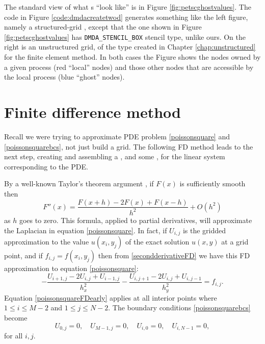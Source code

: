 The standard \PETSc view of what \pDM s ``look like'' is in Figure \ref{fig:petscghostvalues}.  The code in Figure \ref{code:dmdacreatetwod} generates something like the left figure, namely a structured-grid \pDM, except that the one shown in Figure \ref{fig:petscghostvalues} has \texttt{DMDA\_STENCIL\_BOX} stencil type, unlike ours.  On the right is an unstructured grid, of the type created in Chapter \ref{chap:unstructured} for the finite element method.  In both cases the Figure shows the nodes owned by a given process (red ``local'' nodes) and those other nodes that are accessible by the local process (blue ``ghost'' nodes).


\section{Finite difference method}

Recall we were trying to approximate PDE problem \eqref{poissonsquare} and \eqref{poissonsquarebcs}, not just build a grid.  The following FD method leads to the next step, creating and assembling a \pMat, and some \pVecs, for the linear system corresponding to the PDE.

By a well-known Taylor's theorem argument \citep{MortonMayers}, if $F(x)$ is sufficiently smooth then
\begin{equation}
   F''(x) = \frac{F(x+h) - 2 F(x) + F(x-h)}{h^2} + O(h^2)  \label{secondderivativeFD}
\end{equation}
as $h$ goes to zero.  This formula, applied to partial derivatives, will approximate the Laplacian in equation \eqref{poissonsquare}.  In fact, if $U_{i,j}$ is the gridded approximation to the value $u(x_i,y_j)$ of the exact solution $u(x,y)$ at a grid point, and if $f_{i,j} = f(x_i,y_j)$ then from \eqref{secondderivativeFD} we have this FD approximation to equation \eqref{poissonsquare}:
\begin{equation}
- \frac{U_{i+1,j} - 2 U_{i,j} + U_{i-1,j}}{h_x^2} - \frac{U_{i,j+1} - 2 U_{i,j} + U_{i,j-1}}{h_y^2} = f_{i,j}. \label{poissonsquareFDearly}
\end{equation}
Equation \eqref{poissonsquareFDearly} applies at all interior points where $1 \le i \le M-2$ and $1 \le j \le N-2$.  The boundary conditions \eqref{poissonsquarebcs} become
\begin{equation}
U_{0,j} = 0, \quad U_{M-1,j} = 0, \quad U_{i,0} = 0, \quad U_{i,N-1} = 0, \label{poissonsquareFDbcs}
\end{equation}
for all $i,j$.

